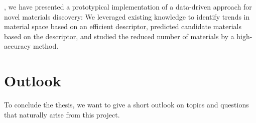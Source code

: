 , we have presented a prototypical implementation of a data-driven approach for novel materials discovery: We leveraged existing knowledge to identify trends in material space based on an efficient descriptor, predicted candidate materials based on the descriptor, and studied the reduced number of materials by a high-accuracy method.


\section*{Outlook}
To conclude the thesis, we want to give a short outlook on topics and questions that naturally arise from this project.


